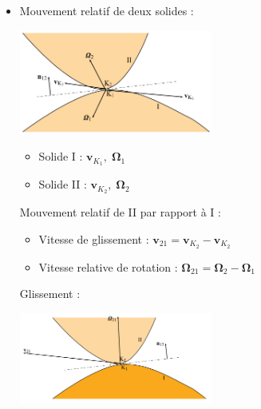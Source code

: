 \documentclass[a4paper]{article}
\begin{document}
\begin{itemize}
\begin{center}
 \end{center}





\item Mouvement relatif de deux solides : 
\begin{center}
\includegraphics[width=0.5\textwidth]{images/Solides.PNG}
\end{center}
\begin{itemize}
\item Solide I : $ \textbf{v}_{K_1}, \; \boldsymbol{\Omega}_1 $
\item Solide II : $ \textbf{v}_{K_2}, \; \boldsymbol{\Omega}_2 $
\end{itemize}
Mouvement relatif de II par rapport à I : 
\begin{itemize}
\item Vitesse de glissement : $ \textbf{v}_{21} = \textbf{v}_{K_2} - \textbf{v}_{K_2} $
\item Vitesse relative de rotation : $ \boldsymbol{\Omega}_{21} = \boldsymbol{\Omega}_2 - \boldsymbol{\Omega}_1 $
\end{itemize}
Glissement : 
\begin{center}
\includegraphics[width=0.5\textwidth]{images/Solides2.PNG}
\end{center}
\begin{itemize}

\end{itemize}
\end{itemize}
\end{document}

